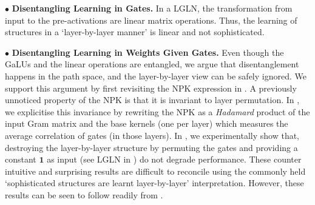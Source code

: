 

$\bullet$ \textbf{Disentangling Learning in Gates.}  In a LGLN, the transformation from input to the pre-activations are linear matrix operations.  Thus, the learning of structures in a `layer-by-layer manner' is linear and not sophisticated.


$\bullet$ \textbf{Disentangling Learning in Weights Given Gates.} Even though the GaLUs and the linear operations are entangled, we argue that disentanglement happens in the path space, and the layer-by-layer view can be safely ignored. We support this argument by first revisiting the NPK expression in \citep{npk}. A previously unnoticed property of the NPK is that it is invariant to layer permutation. In , we explicitise this invariance by rewriting the NPK as a \emph{Hadamard} product of the input Gram matrix and the base kernels (one per layer) which measures the average correlation of gates (in those layers). In , we experimentally show that, destroying the layer-by-layer structure by permuting the gates and providing a constant $\mathbf{1}$ as input (see LGLN in ) do not  degrade performance. These counter intuitive and surprising results are difficult to reconcile using the commonly held `sophisticated structures are learnt layer-by-layer' interpretation.  However, these results can be seen to follow readily from .



